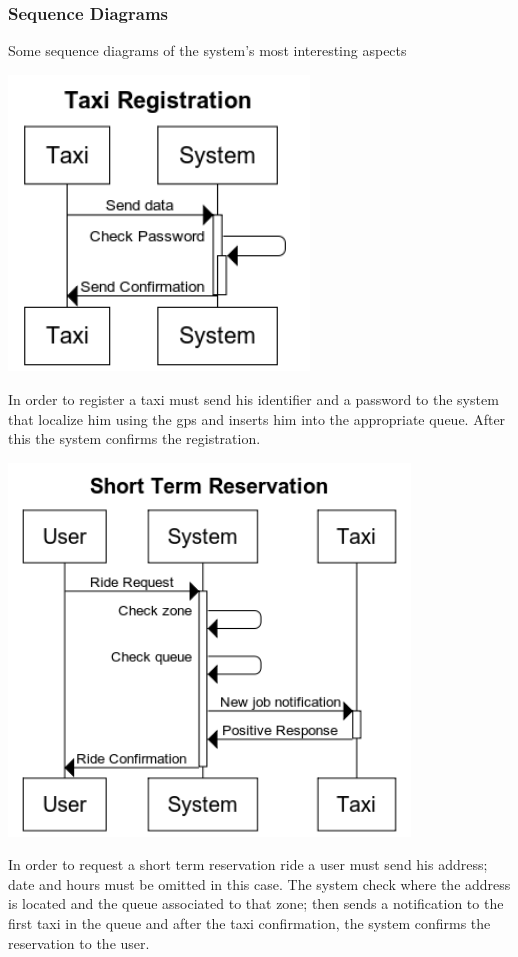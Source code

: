 \subsubsection{Sequence Diagrams}
	Some sequence diagrams of the system's most interesting aspects
	\begin{center}
		\includegraphics[width=0.60\textwidth]{./images/Taxi_Registration}
	\end{center}
	In order to register a taxi must send his identifier and a password to the system that localize him using the gps and inserts him into the appropriate queue. After this the system confirms the registration.
		\newpage
	\begin{center}
		\includegraphics[width=0.80\textwidth]{./images/Short_Term_Reservation}
	\end{center}
	In order to request a short term reservation ride a user must send his address; date and hours must be omitted in this case. The system check where the address is located and the queue associated to that zone; then sends a notification to the first taxi in the queue and after the taxi confirmation, the system confirms the reservation to the user.
